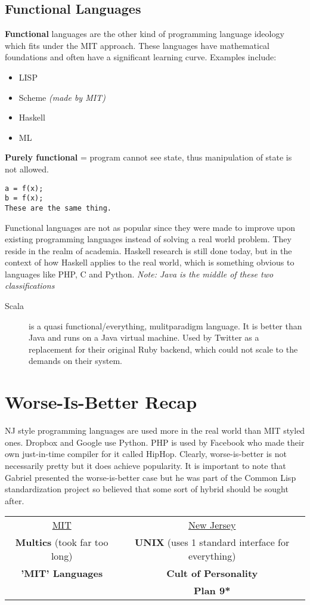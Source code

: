 \documentclass[twoside]{article}
\begin{document}
\subsection{Functional Languages}
\textbf{Functional} languages are the other kind of programming language ideology which fits under the MIT approach. These languages have mathematical foundations and often have a significant learning curve. Examples include:
\begin{itemize}
\item LISP
\item Scheme \emph{(made by MIT)}
\item Haskell
\item ML
\end{itemize}
\textbf{Purely functional} = program cannot see state, thus manipulation of state is not allowed. \begin{verbatim}a = f(x);
b = f(x);
These are the same thing.
\end{verbatim}
Functional languages are not as popular since they were made to improve upon existing programming languages  instead of solving a real world problem. They reside in the realm of academia. Haskell research is still done today, but in the context of how Haskell applies to the real world, which is something obvious to languages like PHP, C and Python. \emph{Note: Java is the middle of these two classifications}
\begin{description}
\item[Scala] is a quasi functional/everything, mulitparadigm language. It is
  better than Java and runs on a Java virtual machine. Used by Twitter as a
  replacement for their original Ruby backend, which could not scale to the
  demands on their system.
\end{description}
\section{Worse-Is-Better Recap}
NJ style programming languages are used more in the real world than MIT styled ones. Dropbox and Google use Python. PHP is used by Facebook who made their own just-in-time compiler for it called HipHop. Clearly, worse-is-better is not necessarily pretty but it does achieve popularity. It is important to note that Gabriel presented the worse-is-better case but he was part of the Common Lisp standardization project so believed that some sort of hybrid should be sought after. \\
\begin{table}[h]
\centering
\begin{tabular}{cc}
{\Large \underline{MIT}} &{\Large \underline{New Jersey}}\\
\textbf{Multics} (took far too long)			& 	\textbf{UNIX} (uses 1 standard interface for everything)\\
\textbf{'MIT' Languages}	&	\textbf{Cult of Personality} \\
			 	& 	\textbf{Plan 9*} \\
\end{tabular}
\end{table}
\end{document}
